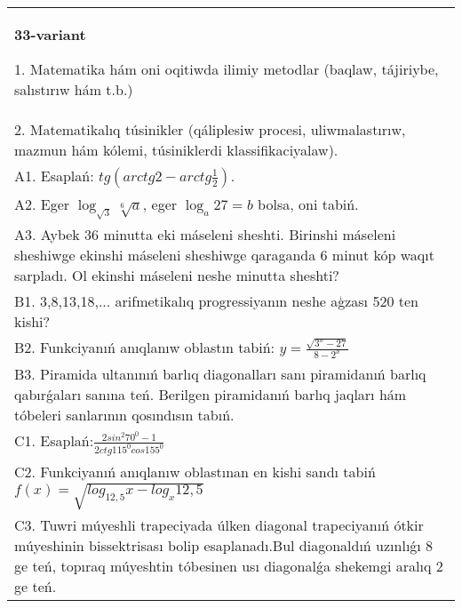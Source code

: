 \documentclass{article}
\begin{document}
\begin{tabular}{m{17cm}}
\textbf{33-variant}

1. Matematika hám oni oqitiwda ilimiy metodlar (baqlaw, tájiriybe, salıstırıw hám t.b.) \\
2. Matematikalıq túsinikler (qáliplesiw procesi, uliwmalastırıw, mazmun hám kólemi, túsiniklerdi klassifikaciyalaw). \\
A1. Esaplań: \(tg\left(arctg2 - arctg\frac{1}{2} \right) \). \\
A2. Eger \(\log_{\sqrt{3}}\sqrt[6]{a}\), eger \(\log_{a}27 = b\) bolsa, oni tabiń. \\
A3. Aybek 36 minutta eki máseleni sheshti. Birinshi máseleni sheshiwge ekinshi máseleni sheshiwge qaraganda 6 minut kóp waqıt sarpladı. Ol ekinshi máseleni neshe minutta sheshti? \\
B1. 3,8,13,18,... arifmetikalıq progressiyanın neshe aģzası 520 ten kishi? \\
B2. Funkciyanıń anıqlanıw oblastın tabiń: \(y = \frac{\sqrt{3^{x} - 27}}{8 - 2^{x}}\) \\
B3. Piramida ultanınıń barlıq diagonalları sanı piramidanıń barlıq qabırǵaları sanına teń. Berilgen piramidanıń barlıq jaqları hám tóbeleri sanlarının qosındısın tabıń. \\
C1. Esaplań:\(\frac{2sin^{2}70^{0} - 1}{2ctg115^{0}cos155^{0}}\) \\
C2. Funkciyanıń anıqlanıw oblastınan en kishi sandı tabiń \(f (x) = \sqrt{log_{12,5}x - log_{x}12,5}\) \\
C3. Tuwri múyeshli trapeciyada úlken diagonal trapeciyanıń ótkir múyeshinin bissektrisası bolip esaplanadı.Bul diagonaldıń uzınlıǵı 8 ge teń, topıraq múyeshtin tóbesinen usı diagonalǵa shekemgi aralıq 2 ge teń. \\

\end{tabular}
\vspace{1cm}
\end{document}
